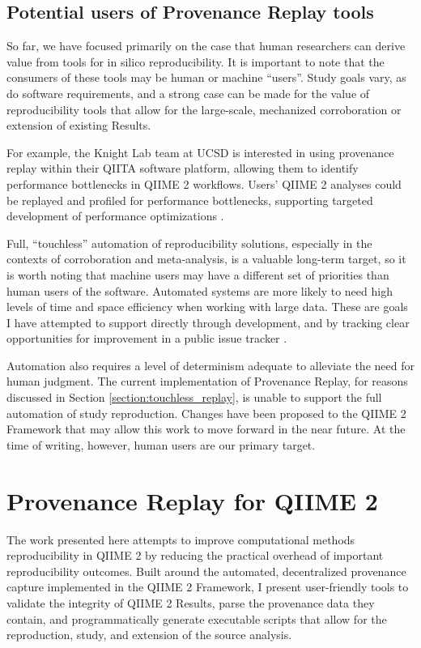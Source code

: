 \subsection{Potential users of Provenance Replay tools}
\label{potential_users}
So far, we have focused primarily on the case that human researchers can derive
value from tools for in silico reproducibility. It is important to note that the
consumers of these tools may be human or machine “users”. Study goals vary, as
do software requirements, and a strong case can be made for the value of
reproducibility tools that allow for the large-scale, mechanized corroboration
or extension of existing Results.

For example, the Knight Lab team at UCSD is interested in using provenance
replay within their QIITA software platform, allowing them to identify
performance bottlenecks in QIIME 2 workflows. Users' QIIME 2 analyses could be
replayed and profiled for performance bottlenecks, supporting targeted
development of performance optimizations \parencite{caporaso_nci_2022}.

Full, “touchless” automation of reproducibility solutions, especially in the
contexts of corroboration and meta-analysis, is a valuable long-term target, so
it is worth noting that machine users may have a different set of priorities
than human users of the software. Automated systems are more likely to need high
levels of time and space efficiency when working with large data. These are
goals I have attempted to support directly through development, and by tracking
clear opportunities for improvement in a public issue tracker \parencite[Issues #29,
60, 62]{keefe_issues_2021}.

Automation also requires a level of determinism adequate to alleviate the need
for human judgment. The current implementation of Provenance Replay, for reasons
discussed in Section \ref{section:touchless_replay}, is unable to support the
full automation of study reproduction. Changes have been proposed to the QIIME 2
Framework that may allow this work to move forward in the near future. At the
time of writing, however, human users are our primary target.


\section{Provenance Replay for QIIME 2}

The work presented here attempts to improve computational methods
reproducibility in QIIME 2 by reducing the practical overhead of important
reproducibility outcomes. Built around the automated, decentralized provenance
capture implemented in the QIIME 2 Framework, I present user-friendly tools to
validate the integrity of QIIME 2 Results, parse the provenance data they
contain, and programmatically generate executable scripts that allow for the
reproduction, study, and extension of the source analysis.

